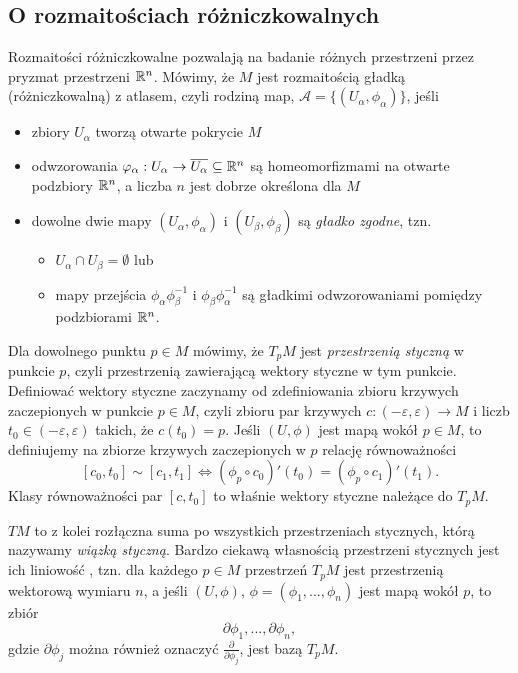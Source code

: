 \subsection{O rozmaitościach różniczkowalnych}\label{dodatek rozmaitosci}

Rozmaitości różniczkowalne pozwalają na badanie różnych przestrzeni przez pryzmat przestrzeni $\mathbb{R}^n$. Mówimy, że $M$ jest rozmaitością gładką (różniczkowalną) z atlasem, czyli rodziną map, $\mathcal{A}=\{ (U_\alpha, \phi_\alpha) \}$, jeśli
\begin{itemize}
  \item zbiory $U_\alpha$ tworzą otwarte pokrycie $M$
  \item odwzorowania $\varphi_\alpha:U_\alpha \to \overline{U_\alpha} \subseteq \mathbb{R}^n$ są homeomorfizmami na otwarte podzbiory $\mathbb{R}^n$, a liczba $n$ jest dobrze określona dla $M$
  \item dowolne dwie mapy $(U_\alpha, \phi_\alpha)$ i $(U_\beta, \phi_\beta)$ są \emph{gładko zgodne}, tzn.
    \begin{itemize}
      \item $U_\alpha \cap U_\beta=\emptyset$ lub
      \item mapy przejścia $\phi_\alpha \phi_\beta^{-1}$ i $\phi_\beta \phi_\alpha^{-1}$ są gładkimi odwzorowaniami pomiędzy podzbiorami $\mathbb{R}^n$.
    \end{itemize}
\end{itemize}

Dla dowolnego punktu $p \in M$ mówimy, że $T_p M$ jest \emph{przestrzenią styczną} w punkcie $p$, czyli przestrzenią zawierającą wektory styczne w tym punkcie. Definiować wektory styczne zaczynamy od zdefiniowania zbioru krzywych zaczepionych w punkcie $p \in M$, czyli zbioru par krzywych $c: (-\varepsilon, \varepsilon) \to M$ i liczb $t_0 \in (-\varepsilon, \varepsilon)$ takich, że $c(t_0)=p$. Jeśli $(U, \phi)$ jest mapą wokół $p \in M$, to definiujemy na zbiorze krzywych zaczepionych w $p$ relację równoważności 
$$ [c_0, t_0] \sim [c_1, t_1] \iff (\phi_p \circ  c_0)'(t_0)=(\phi_p \circ  c_1)'(t_1). $$
Klasy równoważności par $[c, t_0]$ to właśnie wektory styczne należące do $T_p M$.


$T M$ to z kolei rozłączna suma po wszystkich przestrzeniach stycznych, którą nazywamy \emph{wiązką styczną}. Bardzo ciekawą własnością przestrzeni stycznych jest ich liniowość \cite{leeSmoothManifolds}, tzn. dla każdego $p \in M$ przestrzeń $T_p M$ jest przestrzenią wektorową wymiaru $n$, a jeśli $(U, \phi)$, $\phi=(\phi_1,...,\phi_n)$ jest mapą wokół $p$, to zbiór
$$ { \partial \phi_1,..., \partial \phi_n }, $$
gdzie $\partial \phi_j$ można również oznaczyć $\frac{\partial}{\partial \phi_j}$, jest bazą $T_p M$.

